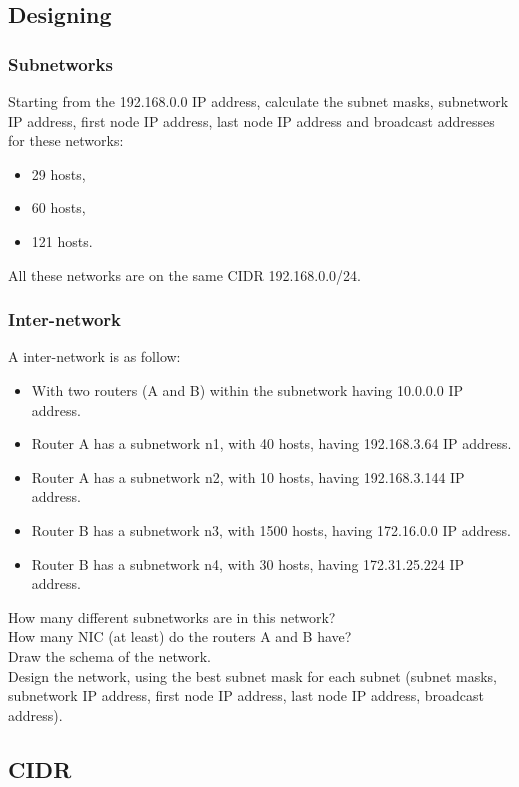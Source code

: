 \documentclass[11pt]{article}
\begin{document}
\subsection{Designing}
\subsubsection{Subnetworks}
Starting from the 192.168.0.0 IP address, calculate the subnet masks, subnetwork IP address, first node IP address, last node IP address and broadcast addresses for these networks:
\begin{itemize}
  \item 29 hosts,
  \item 60 hosts,
  \item 121 hosts.
\end{itemize}
All these networks are on the same CIDR 192.168.0.0/24.

\subsubsection{Inter-network}
A inter-network is as follow:
\begin{itemize}
  \item With two routers (A and B) within the subnetwork having 10.0.0.0      IP address.
  \item Router A has a subnetwork n1, with 40 hosts,     having 192.168.3.64  IP address.
  \item Router A has a subnetwork n2, with 10 hosts,     having 192.168.3.144 IP address.
  \item Router B has a subnetwork n3, with 1500 hosts,   having 172.16.0.0    IP address.
  \item Router B has a subnetwork n4, with 30 hosts,     having 172.31.25.224 IP address.
\end{itemize}
How many different subnetworks are in this network?\\
How many NIC (at least) do the routers A and B have?\\
Draw the schema of the network.\\
Design the network, using the best subnet mask for each subnet (subnet masks, subnetwork IP address, first node IP address, last node IP address, broadcast address).

\subsection{CIDR}
\end{document}
